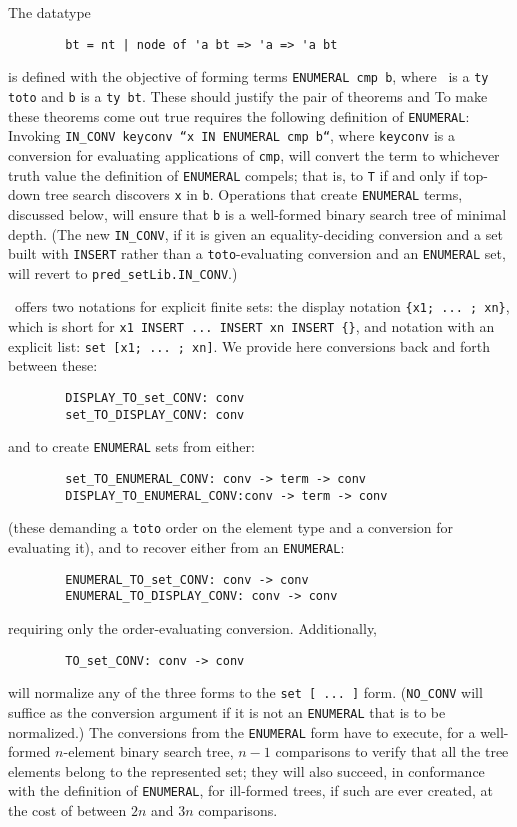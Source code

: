 The datatype
\begin{verbatim}
        bt = nt | node of 'a bt => 'a => 'a bt
\end{verbatim}
is defined with the objective of forming terms \verb$ENUMERAL cmp b$,
where \cmp\ is a \verb$ty toto$ and {\tt b} is a \verb$ty bt$. These should
justify the pair of theorems
and
To make these theorems come out true requires the following definition of
{\tt ENUMERAL}:
Invoking {\tt IN_CONV keyconv ``x IN ENUMERAL cmp b``}, where {\tt keyconv}
is a conversion for evaluating applications of {\tt cmp}, will convert
the term to whichever truth value the definition of {\tt ENUMERAL} compels;
that is, to {\tt T} if and only if top-down tree search discovers {\tt x}
in {\tt b}. Operations that create {\tt ENUMERAL} terms, discussed below,
will ensure that {\tt b} is a well-formed binary search tree of minimal depth.
(The new {\tt IN_CONV}, if it is given an equality-deciding conversion and
a set built with {\tt INSERT} rather than a {\tt toto}-evaluating
conversion and an {\tt ENUMERAL} set, will revert to {\tt pred_setLib.IN_CONV}.)

\HOL\ offers two notations for explicit finite sets: the display notation
{\tt\{x1; ...~; xn\}}, which is short for
{\tt x1 INSERT ... INSERT xn INSERT \{\}}, and notation with an explicit list:
{\tt set [x1; ...~; xn]}. We provide here conversions back and forth
between these:
\begin{verbatim}
        DISPLAY_TO_set_CONV: conv
        set_TO_DISPLAY_CONV: conv
\end{verbatim}
and to create {\tt ENUMERAL} sets from either:
\begin{verbatim}
        set_TO_ENUMERAL_CONV: conv -> term -> conv
        DISPLAY_TO_ENUMERAL_CONV:conv -> term -> conv
\end{verbatim}
(these demanding a {\tt toto} order on the element type and a conversion
for evaluating it),
and to recover either from an {\tt ENUMERAL}:
\begin{verbatim}
        ENUMERAL_TO_set_CONV: conv -> conv
        ENUMERAL_TO_DISPLAY_CONV: conv -> conv
\end{verbatim}
requiring only the order-evaluating conversion. Additionally,
\begin{verbatim}
        TO_set_CONV: conv -> conv
\end{verbatim}
will normalize any of the three forms to the {\tt set [ ... ]} form.
({\tt NO_CONV} will suffice as the conversion argument if it is not an
{\tt ENUMERAL} that is to be normalized.)
The conversions from the {\tt ENUMERAL} form have to execute, for a
well-formed $n$-element binary search tree, $n-1$ comparisons to verify
that all the tree elements belong to the represented set; they will also
succeed, in conformance with the definition of {\tt ENUMERAL}, for
ill-formed trees, if such are ever created, at the cost of between $2n$
and $3n$ comparisons.


